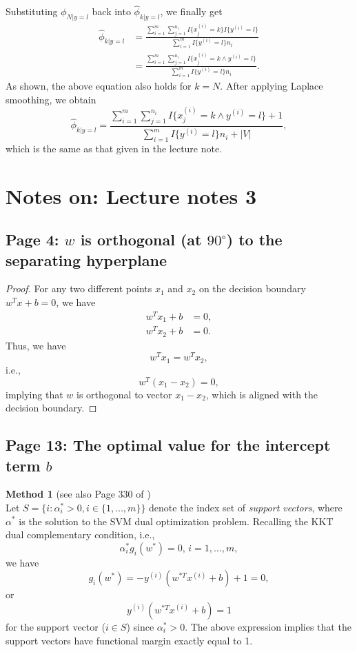 \documentclass{article}
\begin{document}
Substituting $\phi_{N|y=l}$ back into $\hat{\phi}_{k|y=l}$, we finally get
\[
\begin{split}
\hat{\phi}_{k|y=l}
&=\frac{\sum_{i=1}^m\sum_{j=1}^{n_i}I\{x_j^{(i)}=k\}I\{y^{(i)}=l\}}{\sum_{i=1}^m I\{y^{(i)}=l\}n_i}\\
&=\frac{\sum_{i=1}^m\sum_{j=1}^{n_i}I\{x_j^{(i)}=k\land y^{(i)}=l\}}{\sum_{i=1}^m I\{y^{(i)}=l\}n_i}.
\end{split}
\]
As shown, the above equation also holds for $k=N$. After applying Laplace smoothing, we obtain
\[
\hat{\phi}_{k|y=l}=\frac{\sum_{i=1}^m\sum_{j=1}^{n_i}I\{x_j^{(i)}=k\land y^{(i)}=l\}+1}{\sum_{i=1}^m I\{y^{(i)}=l\}n_i+|V|},
\]
which is the same as that given in the lecture note.

\section{Notes on: Lecture notes 3}
\subsection{Page 4: $w$ is orthogonal (at $90^\circ$) to the separating hyperplane}
\begin{proof}
For any two different points $x_1$ and $x_2$ on the decision boundary $w^T x + b = 0$, we have
\[
\begin{split}
w^T x_1 + b &= 0,\\
w^T x_2 + b &= 0.
\end{split}
\]
Thus, we have
\[
w^T x_1 =w^T x_2,
\]
i.e.,
\[
w^T (x_1-x_2)=0,
\]
implying that $w$ is orthogonal to vector $x_1-x_2$, which is aligned with the decision boundary.
\end{proof}

\subsection{Page 13: The optimal value for the intercept term $b$}
\textbf{Method 1} (see also Page 330 of \cite{PRML})\\
Let $S=\{i:\alpha_i^*>0,i\in \{1,\ldots,m\}\}$ denote the index set of \emph{support vectors}, where $\alpha^*$ is the solution to the SVM dual optimization problem. Recalling the KKT dual complementary condition, i.e.,
\[
\alpha_i^* g_i(w^*) = 0,\, i = 1,\ldots,m,
\]
we have
\[
g_i(w^*) = -y^{(i)}(w^{*T}x^{(i)}+b)+1=0,
\]
or
\[
y^{(i)}(w^{*T}x^{(i)}+b)=1
\]
for the support vector ($i\in S$) since $\alpha_i^*>0$. The above expression implies that the support vectors have functional margin exactly equal to 1.
\end{document}
